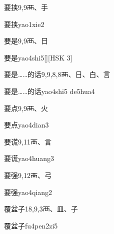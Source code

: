 \begin{entry}{要挟}{9,9}{⾑、⼿}
  \begin{phonetics}{要挟}{yao1xie2}
  \end{phonetics}
\end{entry}

\begin{entry}{要是}{9,9}{⾑、⽇}
  \begin{phonetics}{要是}{yao4shi5}[][HSK 3]
  \end{phonetics}
\end{entry}

\begin{entry}{要是……的话}{9,9,8,8}{⾑、⽇、⽩、⾔}
  \begin{phonetics}{要是……的话}{yao4shi5 de5hua4}
  \end{phonetics}
\end{entry}

\begin{entry}{要点}{9,9}{⾑、⽕}
  \begin{phonetics}{要点}{yao4dian3}
  \end{phonetics}
\end{entry}

\begin{entry}{要谎}{9,11}{⾑、⾔}
  \begin{phonetics}{要谎}{yao4huang3}
  \end{phonetics}
\end{entry}

\begin{entry}{要强}{9,12}{⾑、⼸}
  \begin{phonetics}{要强}{yao4qiang2}
  \end{phonetics}
\end{entry}

\begin{entry}{覆盆子}{18,9,3}{⾑、⽫、⼦}
  \begin{phonetics}{覆盆子}{fu4pen2zi5}
  \end{phonetics}
\end{entry}


